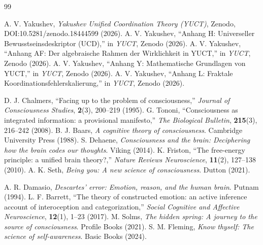 \documentclass[12pt,a4paper]{article}
\begin{document}
	\begin{thebibliography}{99}
		
		 A. V. Yakushev, \emph{Yakushev Unified Coordination Theory (YUCT)}, Zenodo, DOI:10.5281/zenodo.18444599 (2026).
		 A. V. Yakushev, ``Anhang H: Universeller Bewusstseinsdeskriptor (UCD),'' in \emph{YUCT}, Zenodo (2026).
		 A. V. Yakushev, ``Anhang AF: Der algebraische Rahmen der Wirklichkeit in YUCT,'' in \emph{YUCT}, Zenodo (2026).
		 A. V. Yakushev, ``Anhang Y: Mathematische Grundlagen von YUCT,'' in \emph{YUCT}, Zenodo (2026).
		 A. V. Yakushev, ``Anhang L: Fraktale Koordinationsfehlerskalierung,'' in \emph{YUCT}, Zenodo (2026).
		
		 D. J. Chalmers, ``Facing up to the problem of consciousness,'' \emph{Journal of Consciousness Studies}, \textbf{2}(3), 200--219 (1995).
		 G. Tononi, ``Consciousness as integrated information: a provisional manifesto,'' \emph{The Biological Bulletin}, \textbf{215}(3), 216--242 (2008).
		 B. J. Baars, \emph{A cognitive theory of consciousness}. Cambridge University Press (1988).
		 S. Dehaene, \emph{Consciousness and the brain: Deciphering how the brain codes our thoughts}. Viking (2014).
		 K. Friston, ``The free-energy principle: a unified brain theory?,'' \emph{Nature Reviews Neuroscience}, \textbf{11}(2), 127--138 (2010).
		 A. K. Seth, \emph{Being you: A new science of consciousness}. Dutton (2021).
		
		 A. R. Damasio, \emph{Descartes' error: Emotion, reason, and the human brain}. Putnam (1994).
		 L. F. Barrett, ``The theory of constructed emotion: an active inference account of interoception and categorization,'' \emph{Social Cognitive and Affective Neuroscience}, \textbf{12}(1), 1--23 (2017).
		 M. Solms, \emph{The hidden spring: A journey to the source of consciousness}. Profile Books (2021).
		 S. M. Fleming, \emph{Know thyself: The science of self-awareness}. Basic Books (2024).
		

\end{thebibliography}
\end{document}

